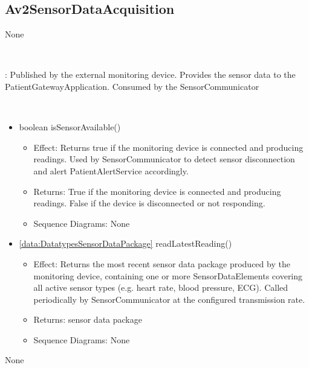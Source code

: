   \subsection{Av2SensorDataAcquisition}\label{int:InterfacesAv2SensorDataAcquisition}
    \begin{description}
      \item[Provided by:] None
      \item[Required by:] \iconcomponent{}~ 
           \item[Description]: Published by the external monitoring device. Provides the sensor data to the PatientGatewayApplication. Consumed by the SensorCommunicator
      \item[Operations:] ~
    \begin{itemize}[noitemsep,nolistsep,leftmargin=-.25cm]
      \item \textsf{boolean isSensorAvailable()}
        \begin{itemize}[noitemsep,nolistsep]
           \item Effect: Returns true if the monitoring device is connected and producing readings. Used by SensorCommunicator to detect sensor disconnection and alert PatientAlertService accordingly. 
           \item Returns: True if the monitoring device is connected and producing readings. False if the device is disconnected or not responding.
           \item Sequence Diagrams: None
        \end{itemize}
      \item \textsf{\ref{data:DatatypesSensorDataPackage} readLatestReading()}
        \begin{itemize}[noitemsep,nolistsep]
           \item Effect: Returns the most recent sensor data package produced by the monitoring device, containing one or more SensorDataElements covering all active sensor types (e.g. heart rate, blood pressure, ECG). Called periodically by SensorCommunicator at the configured transmission rate. 
           \item Returns: sensor data package
           \item Sequence Diagrams: None
        \end{itemize}
    \end{itemize}
      \item[Diagrams:] None
    \end{description}

